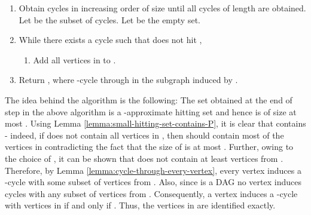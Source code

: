 \documentclass[11pt]{article}
\begin{document}
\begin{enumerate}
\item Obtain cycles in increasing order of size until all cycles of length  are obtained. Let  be the subset of cycles. Let  be the empty set.
\item While there exists a cycle  such that  does not hit ,
\begin{enumerate}
\item Add all vertices in  to .
\end{enumerate}
\item Return , where  -cycle through  in the subgraph induced by .
\end{enumerate}

The idea behind the algorithm is the following: The set  obtained at the end of step  in the above algorithm is a -approximate hitting set and hence is of size at most . Using Lemma \ref{lemma:small-hitting-set-contains-P}, it is clear that  contains  - indeed, if  does not contain all vertices in , then  should contain most of the vertices in  contradicting the fact that the size of  is at most . Further, owing to the choice of , it can be shown that  does not contain at least  vertices from .  Therefore, by Lemma \ref{lemma:cycle-through-every-vertex}, every vertex  induces a -cycle with some subset of vertices from . Also, since  is a DAG no vertex  induces cycles with any subset of vertices from . Consequently, a vertex  induces a -cycle with vertices in  if and only if . Thus, the vertices in  are identified exactly.
\end{document}
